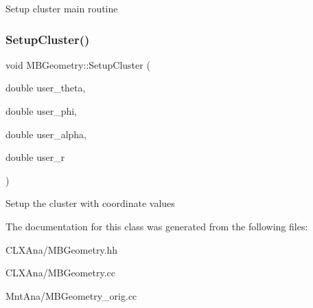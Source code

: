 Setup cluster main routine \mbox{\label{class_m_b_geometry_a93f157cebad3f63dbbefb5b08f3555af}} 
\subsubsection{\texorpdfstring{Setup\+Cluster()}{SetupCluster()}\hspace{0.1cm}{\footnotesize\ttfamily [2/2]}}
{\footnotesize\ttfamily void M\+B\+Geometry\+::\+Setup\+Cluster (\begin{DoxyParamCaption}\item[{double}]{user\+\_\+theta,  }\item[{double}]{user\+\_\+phi,  }\item[{double}]{user\+\_\+alpha,  }\item[{double}]{user\+\_\+r }\end{DoxyParamCaption})}

Setup the cluster with coordinate values 

The documentation for this class was generated from the following files\+:\begin{DoxyCompactItemize}
\item 
C\+L\+X\+Ana/M\+B\+Geometry.\+hh\item 
C\+L\+X\+Ana/M\+B\+Geometry.\+cc\item 
Mnt\+Ana/M\+B\+Geometry\+\_\+orig.\+cc\end{DoxyCompactItemize}
